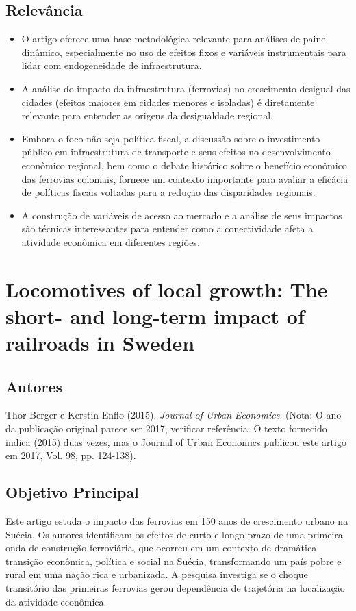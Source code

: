 \documentclass[12pt]{article}
\begin{document}
\subsection*{Relevância}
\begin{itemize}
    \item O artigo oferece uma base metodológica relevante para análises de painel dinâmico, especialmente no uso de efeitos fixos e variáveis instrumentais para lidar com endogeneidade de infraestrutura.
    \item A análise do impacto da infraestrutura (ferrovias) no crescimento desigual das cidades (efeitos maiores em cidades menores e isoladas) é diretamente relevante para entender as origens da desigualdade regional.
    \item Embora o foco não seja política fiscal, a discussão sobre o investimento público em infraestrutura de transporte e seus efeitos no desenvolvimento econômico regional, bem como o debate histórico sobre o benefício econômico das ferrovias coloniais, fornece um contexto importante para avaliar a eficácia de políticas fiscais voltadas para a redução das disparidades regionais.
    \item A construção de variáveis de acesso ao mercado e a análise de seus impactos são técnicas interessantes para entender como a conectividade afeta a atividade econômica em diferentes regiões.
\end{itemize}

\newpage
\section{Locomotives of local growth: The short- and long-term impact of railroads in Sweden}

\subsection*{Autores}
Thor Berger e Kerstin Enflo (2015). \textit{Journal of Urban Economics}. (Nota: O ano da publicação original parece ser 2017, verificar referência. O texto fornecido indica (2015) duas vezes, mas o Journal of Urban Economics publicou este artigo em 2017, Vol. 98, pp. 124-138).

\subsection*{Objetivo Principal}
Este artigo estuda o impacto das ferrovias em 150 anos de crescimento urbano na Suécia. Os autores identificam os efeitos de curto e longo prazo de uma primeira onda de construção ferroviária, que ocorreu em um contexto de dramática transição econômica, política e social na Suécia, transformando um país pobre e rural em uma nação rica e urbanizada. A pesquisa investiga se o choque transitório das primeiras ferrovias gerou dependência de trajetória na localização da atividade econômica.
\end{document}
